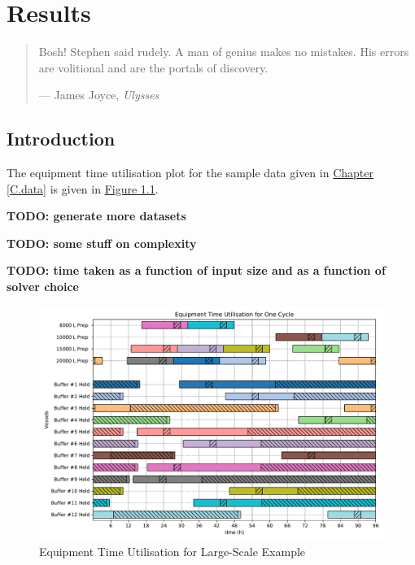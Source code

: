 %
%
%
%

\chapter{Results}\label{C.results}

\begin{quote}
Bosh! Stephen said rudely.
A man of genius makes no mistakes.
His errors are volitional and are the portals of discovery.

\hspace{2cm}--- James Joyce, \emph{Ulysses}
\end{quote}

\section{Introduction}\label{S.intro5}

The equipment time utilisation plot for the sample data given in 
\hyperref[C.data]{Chapter \ref*{C.data}} is given in
\hyperref[fig.etu]{Figure \ref*{fig.etu}}.

\textbf{TODO: generate more datasets}

\textbf{TODO: some stuff on complexity}

\textbf{TODO: time taken as a function of input size and as a function of 
    solver choice}

\newpage
\begin{figure}
    \centering
    \includegraphics[angle=0,scale=0.55]{../examples/large-scale/plot.pdf}
    \caption{Equipment Time Utilisation for Large-Scale Example}
    \label{fig.etu}
\end{figure}
